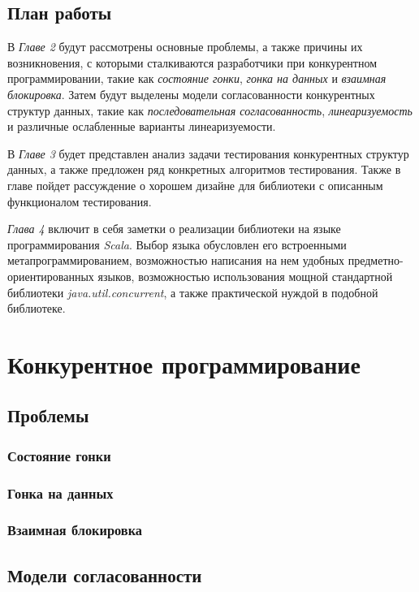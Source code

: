 \documentclass[14pt, openany]{book}
\begin{document}
\section{План работы}
В \textit{Главе 2} будут рассмотрены основные проблемы, а также причины их возникновения, с которыми сталкиваются разработчики при конкурентном программировании, такие как \textit{состояние гонки}, \textit{гонка на данных} и \textit{взаимная блокировка}. Затем будут выделены модели согласованности конкурентных структур данных, такие как \textit{последовательная согласованность}, \textit{линеаризуемость} и различные ослабленные варианты линеаризуемости.\par
В \textit{Главе 3} будет представлен анализ задачи тестирования конкурентных структур данных, а также предложен ряд конкретных алгоритмов тестирования. Также в главе пойдет рассуждение о хорошем дизайне для библиотеки с описанным функционалом тестирования. \par
\textit{Глава 4} включит в себя заметки о реализации библиотеки на языке программирования \textit{Scala}. Выбор языка обусловлен его встроенными метапрограммированием, возможностью написания на нем удобных предметно-ориентированных языков, возможностью использования мощной стандартной библиотеки \textit{java.util.concurrent}, а также практической нуждой в подобной библиотеке.

\chapter{Конкурентное программирование}

\section{Проблемы}

\subsection{Состояние гонки}

\subsection{Гонка на данных}

\subsection{Взаимная блокировка}

\section{Модели согласованности}
\end{document}

